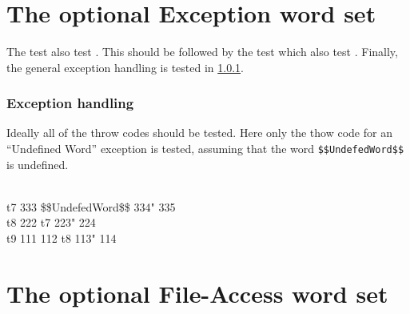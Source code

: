  \\
 \\
 \\

\cbend
{}


\section{The optional Exception word set} %

\cbstart{}
The test  also test .  This should
be followed by the test  which also test
.  Finally, the general exception handling is tested in
\ref{test:throw}.

\setcounter{subsection}{3}
\setcounter{subsubsection}{5}
\subsubsection{Exception handling}
\label{test:throw}

Ideally all of the throw codes should be tested.  Here only the
thow code for an ``Undefined Word'' exception is tested, assuming
that the word \texttt{\$\$UndefedWord\$\$} is undefined.

\begin{tt}
 \\
\word{:} t7  333 \$\$UndefedWord\$\$ 334"  335 \word{;} \\
\word{:} t8  222 t7 223"  224 \word{;} \\
\word{:} t9  111 112 t8 113"  114 \word{;}
\end{tt}


\cbend
{}




\section{The optional File-Access word set} %

